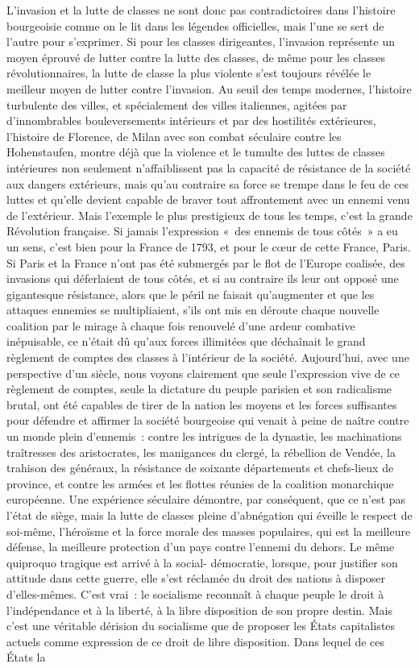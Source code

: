 \documentclass[french,twoside]{book} %
\begin{document}
\noindent L'invasion et la lutte de classes ne sont donc pas contradictoires dans l’histoire bourgeoisie comme on le lit dans les légendes officielles, mais l’une se sert de l’autre pour s’exprimer. Si pour les classes dirigeantes, l’invasion représente un moyen éprouvé de lutter contre la lutte des classes, de même pour les classes révolutionnaires, la lutte de classe la plus violente s’est toujours révélée le meilleur moyen de lutter contre l’invasion. Au seuil des temps modernes, l’histoire turbulente des villes, et spécialement des villes italiennes, agitées par d’innombrables bouleversements intérieurs et par des hostilités extérieures, l’histoire de Florence, de Milan avec son combat séculaire contre les Hohenstaufen, montre déjà que la violence et le tumulte des luttes de classes intérieures non seulement n’affaiblissent pas la capacité de résistance de la société aux dangers extérieurs, mais qu’au contraire sa force se trempe dans le feu de ces luttes et qu’elle devient capable de braver tout affrontement avec un ennemi venu de l’extérieur. Mais l’exemple le plus prestigieux de tous les temps, c’est la grande Révolution française. Si jamais l’expression « des ennemis de tous côtés » a eu un sens, c’est bien pour la France de 1793, et pour le cœur de cette France, Paris. Si Paris et la France n’ont pas été submergés par le flot de l’Europe coalisée, des invasions qui déferlaient de tous côtés, et si au contraire ils leur ont opposé une gigantesque résistance, alors que le péril ne faisait qu’augmenter et que les attaques ennemies se multipliaient, s’ils ont mis en déroute chaque nouvelle coalition par le mirage à chaque fois renouvelé d’une ardeur combative inépuisable, ce n’était dû qu’aux forces illimitées que déchaînait le grand règlement de comptes des classes à l’intérieur de la société. Aujourd’hui, avec une perspective d’un siècle, nous voyons clairement que seule l’expression vive de ce règlement de comptes, seule la dictature du peuple parisien et son radicalisme brutal, ont été capables de tirer de la nation les moyens et les forces suffisantes pour défendre et affirmer la société bourgeoise qui venait à peine de naître contre un monde plein d’ennemis : contre les intrigues de la dynastie, les machinations traîtresses des aristocrates, les manigances du clergé, la rébellion de Vendée, la trahison des généraux, la résistance de soixante départements et chefs-lieux de province, et contre les armées et les flottes réunies de la coalition monarchique européenne. Une expérience séculaire démontre, par conséquent, que ce n’est pas l’état de siège, mais la lutte de classes pleine d’abnégation qui éveille le respect de soi-même, l’héroïsme et la force morale des masses populaires, qui est la meilleure défense, la meilleure protection d’un pays contre l’ennemi du dehors. Le même quiproquo tragique est arrivé à la social-  démocratie, lorsque, pour justifier son attitude dans cette guerre, elle s’est réclamée du droit des nations à disposer d’elles-mêmes. C'est vrai : le socialisme reconnaît à chaque peuple le droit à l’indépendance et à la liberté, à la libre disposition de son propre destin. Mais c’est une véritable dérision du socialisme que de proposer les États capitalistes actuels comme expression de ce droit de libre disposition. Dans lequel de ces États la 
\end{document}
